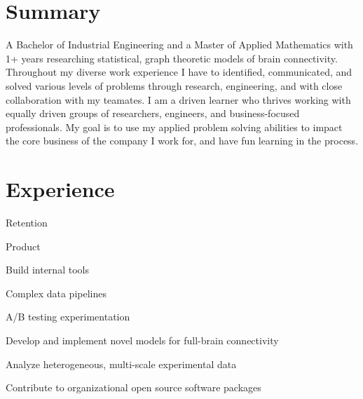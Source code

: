 \documentclass[]{deedy-resume-openfont}
\begin{document}
\hfill
\begin{minipage}[t]{0.63\textwidth}

\section{Summary}
A Bachelor of Industrial Engineering and a Master of Applied Mathematics with
1+ years researching statistical, graph theoretic models of brain connectivity.
Throughout my diverse work experience I have to identified, communicated,
and solved various levels of problems through research, engineering, and with close collaboration
with my teamates. I am a driven learner who thrives working with equally
driven groups of researchers, engineers, and business-focused professionals. My
goal is to use my applied problem solving abilities to impact the core business
of the company I work for, and have fun learning in the process.
\sectionsep




\section{Experience}
\vspace{\topsep}
\begin{tightemize}
\item {Retention}
\item {Product}
\item {Build internal tools}
\item {Complex data pipelines}
\item {A/B testing experimentation}
\end{tightemize}
\sectionsep

\vspace{\topsep}
\begin{tightemize}
\item {Develop and implement novel models for full-brain connectivity}
\item {Analyze heterogeneous, multi-scale experimental data}
\item {Contribute to organizational open source software packages}
\end{tightemize}
\sectionsep


\end{minipage}
\end{document}
